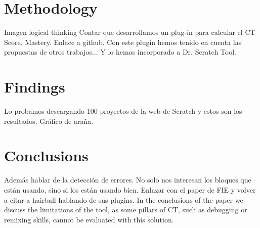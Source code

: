 \documentclass[a4paper,11pt]{article}
\begin{document}
\section{Methodology}
\label{sec:methodology}
Imagen logical thinking
Contar que desarrollamos un plug-in para calcular el CT Score. Mastery. Enlace a github. Con este plugin hemos tenido en cuenta las propuestas de otros trabajos... Y lo hemos incorporado a Dr. Scratch Tool.

\section{Findings}
\label{sec:findings}

Lo probamos descargando 100 proyectos de la web de Scratch y estos son los resultados. Gráfico de araña.

\section{Conclusions}
\label{sec:conclusions}
Además hablar de la detección de errores. No solo nos interesan los bloques que están usando, sino si los están usando bien. Enlazar con el paper de FIE y volver a citar a hairball hablando de sus plugins.
In the conclusions of the paper we discuss the limitations of the tool, as some pillars of CT, such as debugging or remixing skills, cannot be evaluated with this solution.

\newpage


\end{document}
